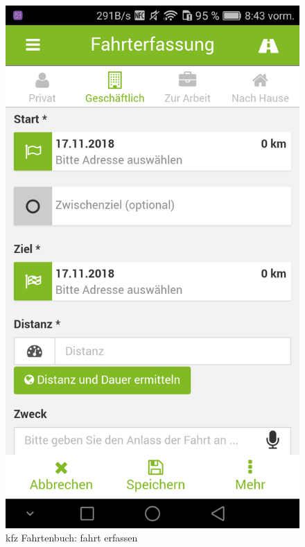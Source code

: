 \documentclass[a4paper]{article}
\begin{document}
\begin{figure}[H]%
    \begin{minipage}[b]{.4\linewidth} %
        \includegraphics[scale=0.14]{img/kfz3}
        \caption{\label{img:img/kfz3}kfz Fahrtenbuch: fahrt erfassen}
    \end{minipage}
    \hspace{0.1\linewidth}%
    \begin{minipage}[b]{.4\linewidth} %

\end{minipage}
\end{figure}
\end{document}
